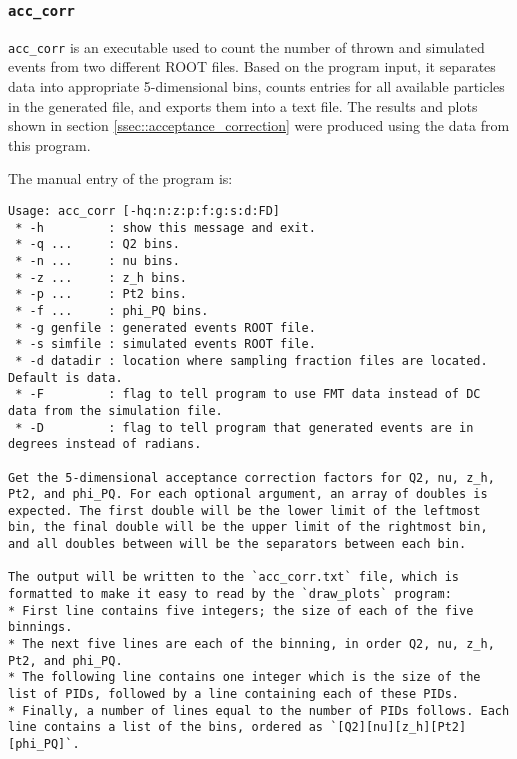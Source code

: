 \subsubsection{\texttt{acc\_corr}}
    \texttt{acc\_corr} is an executable used to count the number of thrown and simulated events from two different ROOT files.
    Based on the program input, it separates data into appropriate 5-dimensional bins, counts entries for all available particles in the generated file, and exports them into a text file.
    The results and plots shown in section \ref{ssec::acceptance_correction} were produced using the data from this program.

    The manual entry of the program is:
    \begin{lstlisting}
Usage: acc_corr [-hq:n:z:p:f:g:s:d:FD]
 * -h         : show this message and exit.
 * -q ...     : Q2 bins.
 * -n ...     : nu bins.
 * -z ...     : z_h bins.
 * -p ...     : Pt2 bins.
 * -f ...     : phi_PQ bins.
 * -g genfile : generated events ROOT file.
 * -s simfile : simulated events ROOT file.
 * -d datadir : location where sampling fraction files are located. Default is data.
 * -F         : flag to tell program to use FMT data instead of DC data from the simulation file.
 * -D         : flag to tell program that generated events are in degrees instead of radians.

Get the 5-dimensional acceptance correction factors for Q2, nu, z_h, Pt2, and phi_PQ. For each optional argument, an array of doubles is expected. The first double will be the lower limit of the leftmost bin, the final double will be the upper limit of the rightmost bin, and all doubles between will be the separators between each bin.

The output will be written to the `acc_corr.txt` file, which is formatted to make it easy to read by the `draw_plots` program:
* First line contains five integers; the size of each of the five binnings.
* The next five lines are each of the binning, in order Q2, nu, z_h, Pt2, and phi_PQ.
* The following line contains one integer which is the size of the list of PIDs, followed by a line containing each of these PIDs.
* Finally, a number of lines equal to the number of PIDs follows. Each line contains a list of the bins, ordered as `[Q2][nu][z_h][Pt2][phi_PQ]`.
    \end{lstlisting}